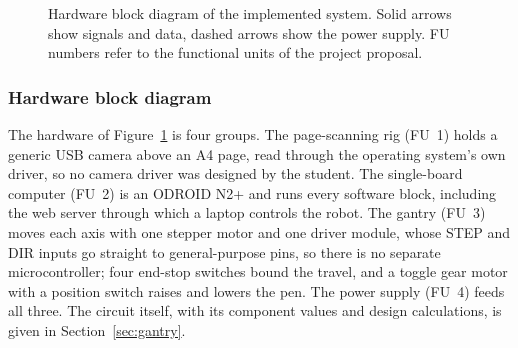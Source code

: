 \begin{figure}[!htbp]
\caption{Hardware block diagram of the implemented system. Solid arrows show signals and data, dashed arrows show the power supply. FU numbers refer to the functional units of the project proposal.}
\label{fig:des-hw}
\end{figure}

\subsubsection{Hardware block diagram}

The hardware of Figure~\ref{fig:des-hw} is four groups. The page-scanning rig (FU~1) holds a generic USB camera above an A4 page, read through the operating system's own driver, so no camera driver was designed by the student. The single-board computer (FU~2) is an ODROID N2+ and runs every software block, including the web server through which a laptop controls the robot. The gantry (FU~3) moves each axis with one stepper motor and one driver module, whose STEP and DIR inputs go straight to general-purpose pins, so there is no separate microcontroller; four end-stop switches bound the travel, and a toggle gear motor with a position switch raises and lowers the pen. The power supply (FU~4) feeds all three.
The circuit itself, with its component values and design calculations, is given in Section~\ref{sec:gantry}.

